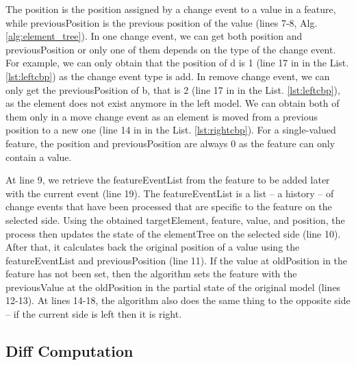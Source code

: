 \documentclass{jot}
\begin{document}
The \textsf{position} is the position assigned by a change event to a value in a feature, while \textsf{previousPosition} is the previous position of the value (lines 7-8, Alg. \ref{alg:element_tree}). In one change event, we can get both \textsf{position} and \textsf{previousPosition} or only one of them depends on the type of the change event. For example, we can only obtain that the \textsf{position} of \textsf{d} is 1 (line 17 in in the List. \ref{lst:leftcbp}) as the change event type is \textsf{add}. In \textsf{remove} change event, we can only get the \textsf{previousPosition} of \textsf{b}, that is 2 (line 17 in in the List. \ref{lst:leftcbp}), as the element does not exist anymore in the left model. We can obtain both of them only in a \textsf{move} change event as an element is moved from a previous position to a new one (line 14 in in the List. \ref{lst:rightcbp}). For a single-valued feature, the \textsf{position} and \textsf{previousPosition} are always 0 as the feature can only contain a value. 

At line 9, we retrieve the \textsf{featureEventList} from the \textsf{feature} to be added later with the current \textsf{event} (line 19). The \textsf{featureEventList} is a list -- a history -- of change events that have been processed that are specific to the \textsf{feature} on the selected \textsf{side}. Using the obtained \textsf{targetElement}, \textsf{feature}, \textsf{value}, and \textsf{position}, the process then updates the state of the \textsf{elementTree} on the selected \textsf{side} (line 10). After that, it calculates back the original position of a value using the \textsf{featureEventList} and \textsf{previousPosition} (line 11). If the value at \textsf{oldPosition} in the \textsf{feature} has not been set, then the algorithm sets the \textsf{feature} with the \textsf{previousValue} at the \textsf{oldPosition} in the partial state of the original model (lines 12-13). At lines 14-18, the algorithm also does the same thing to the opposite side -- if the current \textsf{side} is \textsf{left} then it is \textsf{right}.  




\subsection{Diff Computation}
\label{sec:diff_computation}
\end{document}
